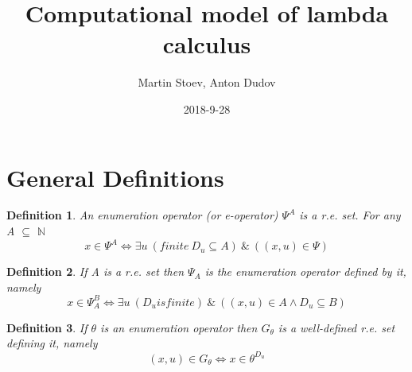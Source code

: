 \documentclass{article}
\title{Computational model of lambda calculus}
\date{2018-9-28}
\author{Martin Stoev, Anton Dudov}
\newtheorem{definition}{Definition}[section] %
\begin{document}
	\maketitle

	\newpage
	\doublespacing
	\singlespacing

	\newpage
		\section{General Definitions}
		\begin{definition}
			An enumeration operator (or e-operator) $\Psi^A$ is a r.e. set. For any A $\subseteq$ $\mathbb{N}$
			\begin{equation}
				x \in \Psi^A \iff \exists u \:(finite \: D_u \subseteq A) \:\&\: ((x, u) \in \Psi)
			\end{equation}
		\end{definition}
			
		\begin{definition}
			If A is a r.e. set then $\Psi_A$ is the enumeration operator defined by it, namely
			\begin{equation}
				x \in \Psi^B_A \iff \exists u \: (D_u is finite) \:\&\: ((x, u) \in A \land D_u \subseteq B)
			\end{equation}
		\end{definition}
		
		\begin{definition}
			If $\theta$ is an enumeration operator then $G_\theta$ is a well-defined r.e. set defining it, namely
			\begin{equation}
				(x, u) \in G_\theta \iff x \in \theta^{D_u}
			\end{equation}
		\end{definition}
\end{document}

